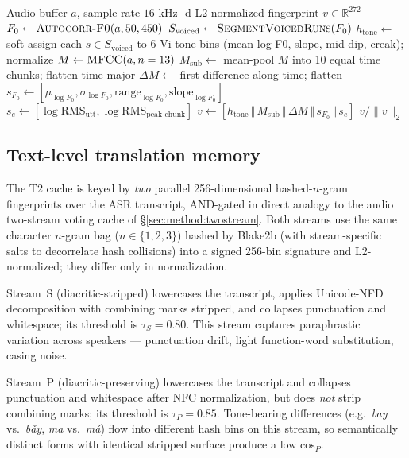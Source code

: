 \documentclass[a4paper,fleqn]{cas-dc}
\begin{document}
\begin{algorithm}
\caption{Tonal-perceptual fingerprint $f(a)$}\label{alg:fingerprint}
\begin{algorithmic}[1]
\Require Audio buffer $a$, sample rate $16$ kHz
-d L2-normalized fingerprint $v \in \mathbb{R}^{272}$
\State $F_0 \gets \textsc{Autocorr-F0}(a, 50, 450)$  
\State $S_{\text{voiced}} \gets \textsc{SegmentVoicedRuns}(F_0)$
\State $h_{\text{tone}} \gets$ soft-assign each $s \in S_{\text{voiced}}$ to 6 Vi tone bins (mean log-F0, slope, mid-dip, creak); normalize
\State $M \gets \textsc{MFCC}(a, n=13)$ 
\State $M_{\text{sub}} \gets$ mean-pool $M$ into 10 equal time chunks; flatten time-major 
\State $\Delta M \gets$ first-difference along time; flatten 
\State $s_{F_0} \gets [\mu_{\log F_0}, \sigma_{\log F_0}, \text{range}_{\log F_0}, \text{slope}_{\log F_0}]$ 
\State $s_e \gets [\log \text{RMS}_{\text{utt}}, \log \text{RMS}_{\text{peak chunk}}]$ 
\State $v \gets [h_{\text{tone}} \,\Vert\, M_{\text{sub}} \,\Vert\, \Delta M \,\Vert\, s_{F_0} \,\Vert\, s_e]$ 
\State \Return $v / \|v\|_2$
\end{algorithmic}
\end{algorithm}

\subsection{Text-level translation memory}\label{sec:method:textcache}

The T2 cache is keyed by \emph{two} parallel 256-dimensional hashed-$n$-gram fingerprints over the ASR transcript, AND-gated in direct analogy to the audio two-stream voting cache of \S\ref{sec:method:twostream}. Both streams use the same character $n$-gram bag ($n \in \{1, 2, 3\}$) hashed by Blake2b (with stream-specific salts to decorrelate hash collisions) into a signed 256-bin signature and L2-normalized; they differ only in normalization.

Stream~S (diacritic-stripped) lowercases the transcript, applies Unicode-NFD decomposition with combining marks stripped, and collapses punctuation and whitespace; its threshold is $\tau_{S} = 0.80$. This stream captures paraphrastic variation across speakers --- punctuation drift, light function-word substitution, casing noise.

Stream~P (diacritic-preserving) lowercases the transcript and collapses punctuation and whitespace after NFC normalization, but does \emph{not} strip combining marks; its threshold is $\tau_{P} = 0.85$. Tone-bearing differences (e.g.\ \emph{bay} vs.\ \emph{b\v{a}y}, \emph{ma} vs.\ \emph{m\'a}) flow into different hash bins on this stream, so semantically distinct forms with identical stripped surface produce a low cos$_{P}$.
\end{document}
